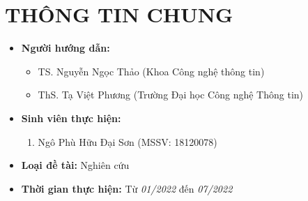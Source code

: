 \documentclass{article}[14pt]
\begin{document}
    \vspace{.5cm}
    
    \Large
    \section{THÔNG TIN CHUNG}
    \begin{itemize}[label = {}]
        
        \item \textbf{Người hướng dẫn:} 
        \begin{itemize}
            \item TS. Nguyễn Ngọc Thảo (Khoa Công nghệ thông tin) 
            \item ThS. Tạ Việt Phương (Trường Đại học Công nghệ Thông tin)
        \end{itemize}{}
    
        
        \item \textbf{Sinh viên thực hiện:}
        
        \begin{enumerate}
            \item Ngô Phù Hữu Đại Sơn (MSSV: 18120078)
        \end{enumerate}

        \item \textbf{Loại đề tài:} Nghiên cứu
        
        \item \textbf{Thời gian thực hiện:} Từ \textit{01/2022} đến \textit{07/2022}
        
        
    \end{itemize}
    
\end{document}
